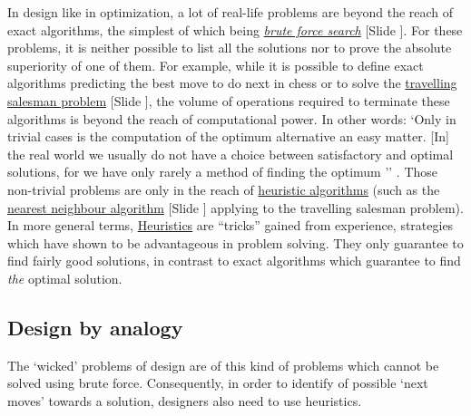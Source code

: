\documentclass{article}
\newcounter{slide}
\begin{document}
In design like in optimization, a lot of real-life problems are beyond the reach of exact algorithms, the simplest of which being \emph{\href{https://en.wikipedia.org/wiki/Brute-force_search}{brute force search}} {\color{blue}[Slide ]}. For these problems, it is neither possible to list all the solutions nor to prove the absolute superiority of one of them. For example, while it is possible to define exact algorithms predicting the best move to do next in chess or to solve the \href{https://en.wikipedia.org/wiki/Travelling_salesman_problem}{travelling salesman problem} {\color{blue}[Slide ]}, the volume of operations required to terminate these algorithms is beyond the reach of computational power. In other words: `Only in trivial cases is the computation of the optimum alternative an easy matter. [In] the real world we usually do not have a choice between satisfactory and optimal solutions, for we have only rarely a method of finding the optimum '' \cite[p. 118-120]{simon1996sciences}. Those non-trivial problems are only in the reach of \href{https://en.wikipedia.org/wiki/Heuristic_(computer_science)}{heuristic algorithms} (such as the \href{https://en.wikipedia.org/wiki/Nearest_neighbour_algorithm}{nearest neighbour algorithm} {\color{blue}[Slide ]} applying to the travelling salesman problem). In more general terms, \href{https://en.wikipedia.org/wiki/Heuristic}{Heuristics} are ``tricks'' gained from experience, strategies which have shown to be advantageous in problem solving. They only guarantee to find fairly good solutions, in contrast to exact algorithms which guarantee to find \emph{the} optimal solution. 

\subsection{Design by analogy}
\label{sec:cbr}
The `wicked' problems of design are of this kind of problems which cannot be solved using brute force. Consequently, in order to identify of possible `next moves' towards a solution, designers also need to use heuristics. 
\end{document}
